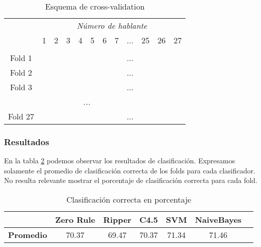 \begin{table}[H]
	\centering
	\begin{tabular}{cccccccccccc}
		& \multicolumn{11}{c}{\textit{Número de hablante}} \\
		& 1 & 2 & 3 & 4 & 5 & 6 & 7 & ... & 25 & 26 & 27 \\
		\hline \\
		Fold 1 &\mycirc[red] & \mycirc[blue] & \mycirc[blue]  & \mycirc[blue]  & \mycirc[blue]  & \mycirc[blue]  & \mycirc[blue] & ... & \mycirc[blue] & \mycirc[blue] & \mycirc[blue]  \\
		
		Fold 2 &\mycirc[blue] & \mycirc[red] & \mycirc[blue]  & \mycirc[blue]  & \mycirc[blue]  & \mycirc[blue]  & \mycirc[blue] & ... & \mycirc[blue] & \mycirc[blue] & \mycirc[blue]  \\
		
		Fold 3 &\mycirc[blue] & \mycirc[blue] & \mycirc[red]  & \mycirc[blue]  & \mycirc[blue]  & \mycirc[blue]  & \mycirc[blue] & ... & \mycirc[blue] & \mycirc[blue] & \mycirc[blue]  \\
	
		\multicolumn{11}{c}{\textit{...}}	\\
		
		Fold 27 &\mycirc[blue] & \mycirc[blue] & \mycirc[blue]  & \mycirc[blue]  & \mycirc[blue]  & \mycirc[blue]  & \mycirc[blue] & ... & \mycirc[blue] & \mycirc[blue] & \mycirc[red]   \\
	
	\end{tabular}
	\caption{Esquema de cross-validation}
	\label{esq_cv}
\end{table}
		
\subsubsection{Resultados}

En la tabla \ref{clas_xval_porHab} podemos observar los resultados de clasificación. Expresamos solamente el promedio de clasificación correcta de los folds para cada clasificador. No resulta relevante mostrar el porcentaje de clasificación correcta para cada fold. 

\begin{table}[H]
	\centering
	\begin{tabular}{|l|c|c|c|c|c|c|}
		\hline
		\textbf{}  & \textbf{Zero Rule} & \textbf{Ripper} & \textbf{C4.5} & \textbf{SVM} & \textbf{NaiveBayes} \\ \hline
		\textbf{Promedio} & 70.37  & 69.47 & 70.37 & 71.34 & 71.46 \\ \hline
	\end{tabular}
	\caption{Clasificación correcta en porcentaje}
	\label{clas_xval_porHab}
\end{table}

